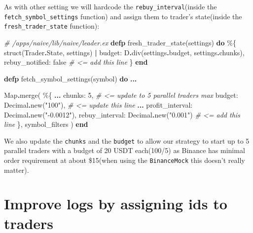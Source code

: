 \documentclass[
]{book}
\newenvironment{Shaded}{\begin{snugshade}}{\end{snugshade}}
\newcommand{\CommentTok}[1]{\textcolor[rgb]{0.56,0.35,0.01}{\textit{#1}}}
\newcommand{\ConstantTok}[1]{\textcolor[rgb]{0.00,0.00,0.00}{#1}}
\newcommand{\DecValTok}[1]{\textcolor[rgb]{0.00,0.00,0.81}{#1}}
\newcommand{\KeywordTok}[1]{\textcolor[rgb]{0.13,0.29,0.53}{\textbf{#1}}}
\newcommand{\NormalTok}[1]{#1}
\newcommand{\OperatorTok}[1]{\textcolor[rgb]{0.81,0.36,0.00}{\textbf{#1}}}
\newcommand{\StringTok}[1]{\textcolor[rgb]{0.31,0.60,0.02}{#1}}
\newcommand{\VariableTok}[1]{\textcolor[rgb]{0.00,0.00,0.00}{#1}}
\begin{document}
As with other setting we will hardcode the \texttt{rebuy\_interval}(inside the \texttt{fetch\_symbol\_settings} function) and assign them to
trader's state(inside the \texttt{fresh\_trader\_state} function):

\begin{Shaded}
\begin{Highlighting}[]
  \CommentTok{\# /apps/naive/lib/naive/leader.ex}
  \KeywordTok{defp}\NormalTok{ fresh\_trader\_state(settings) }\KeywordTok{do}
\NormalTok{    \%\{}
\NormalTok{      struct(}\ConstantTok{Trader}\OperatorTok{.}\ConstantTok{State}\NormalTok{, settings)}
      \OperatorTok{|} \VariableTok{budget:}\NormalTok{ D}\OperatorTok{.}\NormalTok{div(settings}\OperatorTok{.}\NormalTok{budget, settings}\OperatorTok{.}\NormalTok{chunks),}
        \VariableTok{rebuy\_notified:} \ConstantTok{false} \CommentTok{\# \textless{}= add this line}
\NormalTok{    \}}
  \KeywordTok{end}

  \KeywordTok{defp}\NormalTok{ fetch\_symbol\_settings(symbol) }\KeywordTok{do}
    \OperatorTok{...}

    \ConstantTok{Map}\OperatorTok{.}\NormalTok{merge(}
\NormalTok{      \%\{}
        \OperatorTok{...}
        \VariableTok{chunks:} \DecValTok{5}\NormalTok{, }\CommentTok{\# \textless{}= update to 5 parallel traders max}
        \VariableTok{budget:} \ConstantTok{Decimal}\OperatorTok{.}\NormalTok{new(}\StringTok{"100"}\NormalTok{), }\CommentTok{\# \textless{}= update this line}
        \OperatorTok{...}
        \VariableTok{profit\_interval:} \ConstantTok{Decimal}\OperatorTok{.}\NormalTok{new(}\StringTok{"{-}0.0012"}\NormalTok{),}
        \VariableTok{rebuy\_interval:} \ConstantTok{Decimal}\OperatorTok{.}\NormalTok{new(}\StringTok{"0.001"}\NormalTok{) }\CommentTok{\# \textless{}= add this line}
\NormalTok{      \},}
\NormalTok{      symbol\_filters}
\NormalTok{    )}
  \KeywordTok{end}
\end{Highlighting}
\end{Shaded}

We also update the \texttt{chunks} and the \texttt{budget} to allow our strategy to start up to 5 parallel traders with a budget of 20 USDT each(100/5) as Binance has minimal order requirement at about \$15(when using the \texttt{BinanceMock} this doesn't really matter).

\hypertarget{improve-logs-by-assigning-ids-to-traders}{%
\section{Improve logs by assigning ids to traders}\label{improve-logs-by-assigning-ids-to-traders}}
\end{document}
